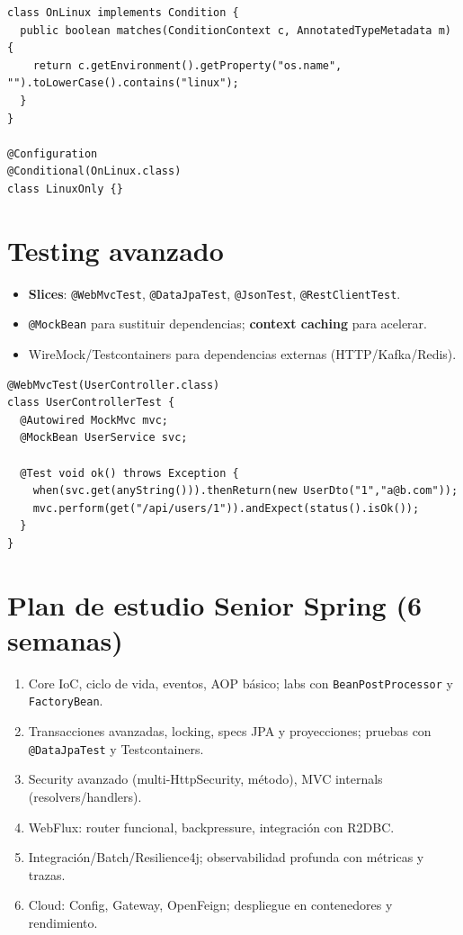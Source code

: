 \documentclass[11pt,a4paper]{article}
\begin{document}
\begin{lstlisting}[style=javastyle, caption={Condition personalizada}]
class OnLinux implements Condition {
  public boolean matches(ConditionContext c, AnnotatedTypeMetadata m) {
    return c.getEnvironment().getProperty("os.name", "").toLowerCase().contains("linux");
  }
}

@Configuration
@Conditional(OnLinux.class)
class LinuxOnly {}
\end{lstlisting}

\section{Testing avanzado}
\begin{itemize}[leftmargin=*]
  \item \textbf{Slices}: \texttt{@WebMvcTest}, \texttt{@DataJpaTest}, \texttt{@JsonTest}, \texttt{@RestClientTest}.
  \item \texttt{@MockBean} para sustituir dependencias; \textbf{context caching} para acelerar.
  \item WireMock/Testcontainers para dependencias externas (HTTP/Kafka/Redis).
\end{itemize}

\begin{lstlisting}[style=javastyle, caption={@WebMvcTest con servicio simulado}]
@WebMvcTest(UserController.class)
class UserControllerTest {
  @Autowired MockMvc mvc;
  @MockBean UserService svc;

  @Test void ok() throws Exception {
    when(svc.get(anyString())).thenReturn(new UserDto("1","a@b.com"));
    mvc.perform(get("/api/users/1")).andExpect(status().isOk());
  }
}
\end{lstlisting}

\section{Plan de estudio Senior Spring (6 semanas)}
\begin{enumerate}[leftmargin=*]
  \item Core IoC, ciclo de vida, eventos, AOP básico; labs con \texttt{BeanPostProcessor} y \texttt{FactoryBean}.
  \item Transacciones avanzadas, locking, specs JPA y proyecciones; pruebas con \texttt{@DataJpaTest} y Testcontainers.
  \item Security avanzado (multi-HttpSecurity, método), MVC internals (resolvers/handlers).
  \item WebFlux: router funcional, backpressure, integración con R2DBC.
  \item Integración/Batch/Resilience4j; observabilidad profunda con métricas y trazas.
  \item Cloud: Config, Gateway, OpenFeign; despliegue en contenedores y rendimiento.
\end{enumerate}
\end{document}
